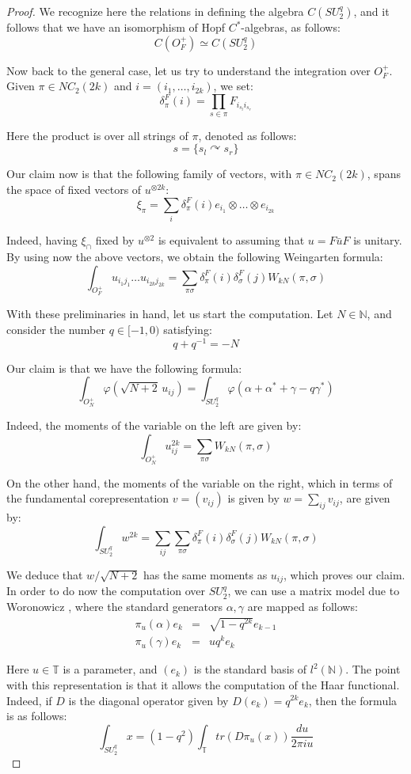 \documentclass[12pt]{amsbook}
\begin{document}
\begin{proof}
We recognize here the relations in \cite{wo1} defining the algebra $C(SU^q_2)$, and it follows that we have an isomorphism of Hopf $C^*$-algebras, as follows:
$$C(O_F^+)\simeq C(SU^q_2)$$

Now back to the general case, let us try to understand the integration over $O_F^+$. Given $\pi\in NC_2(2k)$ and $i=(i_1,\ldots,i_{2k})$, we set:
$$\delta_\pi^F(i)=\prod_{s\in\pi}F_{i_{s_l}i_{s_r}}$$

Here the product is over all strings of $\pi$, denoted as follows:
$$s=\{s_l\curvearrowright s_r\}$$

Our claim now is that the following family of vectors, with $\pi\in NC_2(2k)$, spans the space of fixed vectors of $u^{\otimes 2k}$:
$$\xi_\pi=\sum_i\delta_\pi^F(i)e_{i_1}\otimes\ldots\otimes e_{i_{2k}}$$ 

Indeed, having $\xi_\cap$ fixed by $u^{\otimes 2}$ is equivalent to assuming that $u=F\bar{u}F$ is unitary. By using now the above vectors, we obtain the following Weingarten formula:
$$\int_{O_F^+}u_{i_1j_1}\ldots u_{i_{2k}j_{2k}}=\sum_{\pi\sigma}\delta_\pi^F(i)\delta_\sigma^F(j)W_{kN}(\pi,\sigma)$$

With these preliminaries in hand, let us start the computation. Let $N\in\mathbb N$, and consider the number $q\in [-1,0)$ satisfying:
$$q+q^{-1}=-N$$

Our claim is that we have the following formula:
$$\int_{O_N^+}\varphi(\sqrt{N+2}\,u_{ij})=\int_{SU^q_2}\varphi(\alpha+\alpha^*+\gamma-q\gamma^*)$$

Indeed, the moments of the variable on the left are given by:
$$\int_{O_N^+}u_{ij}^{2k}=\sum_{\pi\sigma}W_{kN}(\pi,\sigma)$$

On the other hand, the moments of the variable on the right, which in terms of the fundamental corepresentation $v=(v_{ij})$ is given by $w=\sum_{ij}v_{ij}$, are given by:
$$\int_{SU^q_2}w^{2k}=\sum_{ij}\sum_{\pi\sigma}\delta_\pi^F(i)\delta_\sigma^F(j)W_{kN}(\pi,\sigma)$$

We deduce that $w/\sqrt{N+2}$ has the same moments as $u_{ij}$, which proves our claim. In order to do now the computation over $SU^q_2$, we can use a matrix model due to Woronowicz \cite{wo1}, where the standard generators $\alpha,\gamma$ are mapped as follows:
\begin{eqnarray*}
\pi_u(\alpha)e_k&=&\sqrt{1-q^{2k}}e_{k-1}\\
\pi_u(\gamma)e_k&=&uq^k e_k
\end{eqnarray*}

Here $u\in\mathbb T$ is a parameter, and $(e_k)$ is the standard basis of $l^2(\mathbb N)$. The point with this representation is that it allows the computation of the Haar functional. Indeed, if $D$ is the diagonal operator given by $D(e_k)=q^{2k}e_k$, then the formula is as follows:
$$\int _{SU^q_2}x=(1-q^2)\int_{\mathbb T}tr(D\pi_u(x))\frac{du}{2\pi iu}$$


\end{proof}
\end{document}
